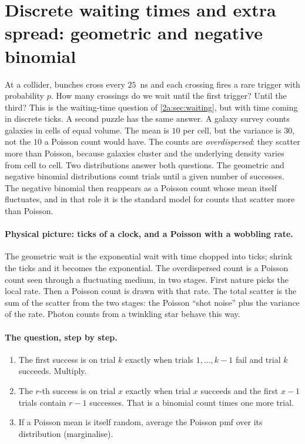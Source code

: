 \section{Discrete waiting times and extra spread: geometric and negative binomial}\label{2a:sec:negbin}

At a collider, bunches cross every $25$~ns and each crossing fires a rare trigger with probability $p$. How many crossings do we wait until the first trigger? Until the third? This is the waiting-time question of \cref{2a:sec:waiting}, but with time coming in discrete ticks. A second puzzle has the same answer. A galaxy survey counts galaxies in cells of equal volume. The mean is $10$ per cell, but the variance is $30$, not the $10$ a Poisson count would have. The counts are \emph{overdispersed}: they scatter more than Poisson, because galaxies cluster and the underlying density varies from cell to cell. Two distributions answer both questions. The geometric and negative binomial distributions count trials until a given number of successes. The negative binomial then reappears as a Poisson count whose mean itself fluctuates, and in that role it is the standard model for counts that scatter more than Poisson.

\paragraph{Physical picture: ticks of a clock, and a Poisson with a wobbling rate.}
The geometric wait is the exponential wait with time chopped into ticks; shrink the ticks and it becomes the exponential. The overdispersed count is a Poisson count seen through a fluctuating medium, in two stages. First nature picks the local rate. Then a Poisson count is drawn with that rate. The total scatter is the sum of the scatter from the two stages: the Poisson ``shot noise'' plus the variance of the rate. Photon counts from a twinkling star behave this way.

\paragraph{The question, step by step.}
\begin{enumerate}[leftmargin=1.6em,itemsep=1pt]
  \item The first success is on trial $k$ exactly when trials $1,\dots,k-1$ fail and trial $k$ succeeds. Multiply.
  \item The $r$-th success is on trial $x$ exactly when trial $x$ succeeds and the first $x-1$ trials contain $r-1$ successes. That is a binomial count times one more trial.
  \item If a Poisson mean is itself random, average the Poisson pmf over its distribution (marginalise).
\end{enumerate}

